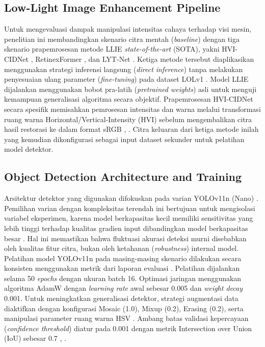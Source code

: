 \documentclass[conference]{IEEEtran}
\begin{document}
\subsection{Low-Light Image Enhancement Pipeline} Untuk mengevaluasi dampak manipulasi intensitas cahaya terhadap visi mesin, penelitian ini membandingkan skenario citra mentah (\textit{baseline}) dengan tiga skenario prapemrosesan metode LLIE \textit{state-of-the-art} (SOTA), yakni HVI-CIDNet \cite{yan2025hvi}, RetinexFormer \cite{cai2023retinexformer}, dan LYT-Net \cite{brateanu2025lytnet}.
Ketiga metode tersebut diaplikasikan menggunakan strategi inferensi langsung (\textit{direct inference}) tanpa melakukan penyesuaian ulang parameter (\textit{fine-tuning}) pada dataset LOLv1 \cite{proposal2026sempro}. Model LLIE dijalankan menggunakan bobot pra-latih (\textit{pretrained weights}) asli untuk menguji kemampuan generalisasi algoritma secara objektif. Prapemrosesan HVI-CIDNet secara spesifik memisahkan pemrosesan intensitas dan warna melalui transformasi ruang warna Horizontal/Vertical-Intensity (HVI) sebelum mengembalikan citra hasil restorasi ke dalam format sRGB \cite{yan2025hvi}, \cite{proposal2026sempro}. Citra keluaran dari ketiga metode inilah yang kemudian dikonfigurasi sebagai input dataset sekunder untuk pelatihan model detektor.

\subsection{Object Detection Architecture and Training} Arsitektur detektor yang digunakan difokuskan pada varian YOLOv11n (Nano) \cite{khanam2024yolov11}. Pemilihan varian dengan kompleksitas terendah ini bertujuan untuk mengisolasi variabel eksperimen, karena model berkapasitas kecil memiliki sensitivitas yang lebih tinggi terhadap kualitas gradien input dibandingkan model berkapasitas besar \cite{proposal2026sempro}. Hal ini memastikan bahwa fluktuasi akurasi deteksi murni disebabkan oleh kualitas fitur citra, bukan oleh ketahanan (\textit{robustness}) internal model.
Pelatihan model YOLOv11n pada masing-masing skenario dilakukan secara konsisten menggunakan metrik dari laporan evaluasi \cite{report2026internal}. Pelatihan dijalankan selama 50 \textit{epochs} dengan ukuran batch 16. Optimasi jaringan menggunakan algoritma AdamW dengan \textit{learning rate} awal sebesar 0.005 dan \textit{weight decay} 0.001. Untuk meningkatkan generalisasi detektor, strategi augmentasi data diaktifkan dengan konfigurasi Mosaic (1.0), Mixup (0.2), Erasing (0.2), serta manipulasi parameter ruang warna HSV \cite{report2026internal}. Ambang batas validasi kepercayaan (\textit{confidence threshold}) diatur pada 0.001 dengan metrik Intersection over Union (IoU) sebesar 0.7 \cite{report2026internal}, \cite{metrics2026formulas}.
\end{document}
